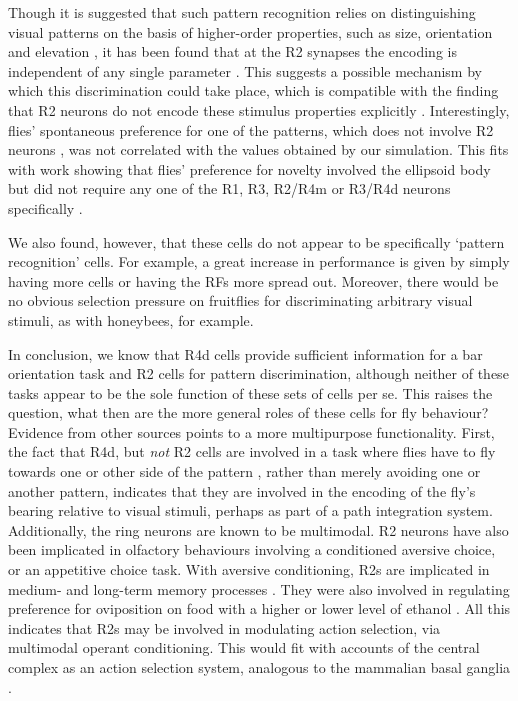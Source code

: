 Though it is suggested that such pattern recognition relies on distinguishing visual patterns on the basis of higher-order properties, such as size, orientation and elevation \cite{Ernst1999,Pan2009}, it has been found that at the R2 synapses the encoding is independent of any single parameter \cite{Liu2006}.
This suggests a possible mechanism by which this discrimination could take place, which is compatible with the finding that R2 neurons do not encode these stimulus properties explicitly \cite{Liu2006}. Interestingly, flies' spontaneous preference for one of the patterns, which does not involve R2 neurons \cite{Ernst1999}, was not correlated with the values obtained by our simulation.
This fits with work showing that flies' preference for novelty involved the ellipsoid body but did not require any one of the R1, R3, R2/R4m or R3/R4d neurons specifically \cite{Solanki2015}.

We also found, however, that these cells do not appear to be specifically `pattern recognition' cells.
For example, a great increase in performance is given by simply having more cells or having the RFs more spread out.
Moreover, there would be no obvious selection pressure on fruitflies for discriminating arbitrary visual stimuli, as with honeybees, for example.

In conclusion, we know that R4d cells provide sufficient information for a bar orientation task and R2 cells for pattern discrimination, although neither of these tasks appear to be the sole function of these sets of cells per se.
This raises the question, what then are the more general roles of these cells for fly behaviour?
Evidence from other sources points to a more multipurpose functionality.
First, the fact that R4d, but \emph{not} R2 cells are involved in a task where flies have to fly towards one or other side of the pattern \cite{Guo2015}, rather than merely avoiding one or another pattern, indicates that they are involved in the encoding of the fly's bearing relative to visual stimuli, perhaps as part of a path integration system.
Additionally, the ring neurons are known to be multimodal.
R2 neurons have also been implicated in olfactory behaviours involving a conditioned aversive choice, or an appetitive choice task.
With aversive conditioning, R2s are implicated in medium- and long-term memory processes \cite{Zhang2013,Zhang2015}.
They were also involved in regulating preference for oviposition on food with a higher or lower level of ethanol \cite{Azanchi2013}.
All this indicates that R2s may be involved in modulating action selection, via multimodal operant conditioning.
This would fit with accounts of the central complex as an action selection system, analogous to the mammalian basal ganglia \cite{Strausfeld2013}.

